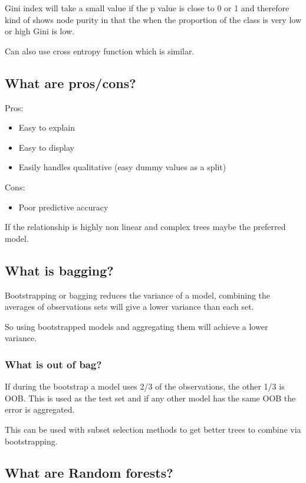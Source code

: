 \documentclass[11pt]{scrartcl} %
\begin{document}
Gini index will take a small value if the p value is close to 0 or 1 and therefore kind of shows
node purity in that the when the proportion of the class is very low or high Gini is low.

Can also use cross entropy function which is similar.

\subsection{What are pros/cons?}

Pros:
\begin{itemize}
	\item Easy to explain
	\item Easy to display
	\item Easily handles qualitative (easy dummy values as a split)
\end{itemize}

Cons:
\begin{itemize}
	\item Poor predictive accuracy
\end{itemize}

If the relationship is highly non linear and complex trees maybe the preferred model.

\subsection{What is bagging?}

Bootstrapping or bagging reduces the variance of a model, combining the averages of observations sets
will give a lower variance than each set.

So using bootstrapped models and aggregating them will achieve a lower variance.

\subsubsection{What is out of bag?}

If during the bootstrap a model uses 2/3 of the observations, the other 1/3 is OOB. This is used
as the test set and if any other model has the same OOB the error is aggregated.

This can be used with subset selection methods to get better trees to combine via bootstrapping.

\subsection{What are Random forests?}
\end{document}
